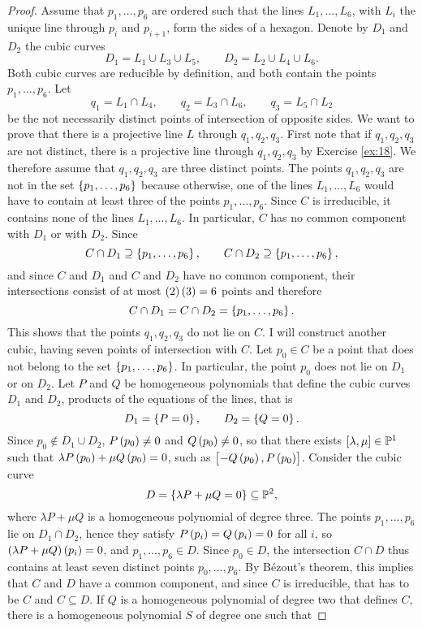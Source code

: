 \begin{proof}
Assume that $ p_1, \dots, p_6 $ are ordered such that the lines $ L_1, \dots, L_6 $, with $ L_i $ the unique line through $ p_i $ and $ p_{i + 1} $, form the sides of a hexagon. Denote by $ D_1 $ and $ D_2 $ the cubic curves
$$ D_1 = L_1 \cup L_3 \cup L_5, \qquad D_2 = L_2 \cup L_4 \cup L_6. $$
Both cubic curves are reducible by definition, and both contain the points $ p_1, \dots, p_6 $. Let
$$ q_1 = L_1 \cap L_4, \qquad q_2 = L_3 \cap L_6, \qquad q_3 = L_5 \cap L_2 $$
be the not necessarily distinct points of intersection of opposite sides. We want to prove that there is a projective line $ L $ through $ q_1, q_2, q_3 $. First note that if $ q_1, q_2, q_3 $ are not distinct, there is a projective line through $ q_1, q_2, q_3 $ by Exercise \ref{ex:18}. We therefore assume that $ q_1, q_2, q_3 $ are three distinct points. The points $ q_1, q_2, q_3 $ are not in the set $ \cbr{p_1, \dots, p_6} $ because otherwise, one of the lines $ L_1, \dots, L_6 $ would have to contain at least three of the points $ p_1, \dots, p_6 $. Since $ C $ is irreducible, it contains none of the lines $ L_1, \dots, L_6 $. In particular, $ C $ has no common component with $ D_1 $ or with $ D_2 $. Since
$$ C \cap D_1 \supseteq \cbr{p_1, \dots, p_6}, \qquad C \cap D_2 \supseteq \cbr{p_1, \dots, p_6}, $$
and since $ C $ and $ D_1 $ and $ C $ and $ D_2 $ have no common component, their intersections consist of at most $ \br{2}\br{3} = 6 $ points and therefore
$$ C \cap D_1 = C \cap D_2 = \cbr{p_1, \dots, p_6}. $$
This shows that the points $ q_1, q_2, q_3 $ do not lie on $ C $. I will construct another cubic, having seven points of intersection with $ C $. Let $ p_0 \in C $ be a point that does not belong to the set $ \cbr{p_1, \dots, p_6} $. In particular, the point $ p_0 $ does not lie on $ D_1 $ or on $ D_2 $. Let $ P $ and $ Q $ be homogeneous polynomials that define the cubic curves $ D_1 $ and $ D_2 $, products of the equations of the lines, that is
$$ D_1 = \cbr{P = 0}, \qquad D_2 = \cbr{Q = 0}. $$
Since $ p_0 \notin D_1 \cup D_2 $, $ P\br{p_0} \ne 0 $ and $ Q\br{p_0} \ne 0 $, so that there exists $ \sbr{\lambda, \mu} \in \PP^1 $ such that $ \lambda P\br{p_0} + \mu Q\br{p_0} = 0 $, such as $ \sbr{-Q\br{p_0}, P\br{p_0}} $. Consider the cubic curve
$$ D = \cbr{\lambda P + \mu Q = 0} \subseteq \PP^2, $$
where $ \lambda P + \mu Q $ is a homogeneous polynomial of degree three. The points $ p_1, \dots, p_6 $ lie on $ D_1 \cap D_2 $, hence they satisfy $ P\br{p_i} = Q\br{p_i} = 0 $ for all $ i $, so $ \br{\lambda P + \mu Q}\br{p_i} = 0 $, and $ p_1, \dots, p_6 \in D $. Since $ p_0 \in D $, the intersection $ C \cap D $ thus contains at least seven distinct points $ p_0, \dots, p_6 $. By B\'ezout's theorem, this implies that $ C $ and $ D $ have a common component, and since $ C $ is irreducible, that has to be $ C $ and $ C \subseteq D $. If $ Q $ is a homogeneous polynomial of degree two that defines $ C $, there is a homogeneous polynomial $ S $ of degree one such that

\end{proof}
